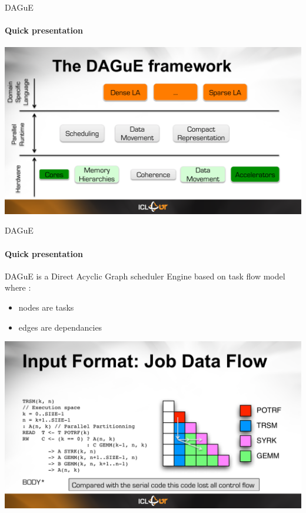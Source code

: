 \begin{frame}{DAGuE}
\framesubtitle{Quick presentation}
\begin{center}
\includegraphics[scale=0.5]{3layer.pdf}
\end{center}
\end{frame}

\begin{frame}{DAGuE}
\framesubtitle{Quick presentation}
DAGuE is a Direct Acyclic Graph scheduler Engine based on task flow model where :
\begin{itemize}
\item nodes are tasks
\item edges are dependancies
\end{itemize}
\begin{center}
\includegraphics[scale=0.5]{trsm.pdf}
\end{center}
\end{frame}

